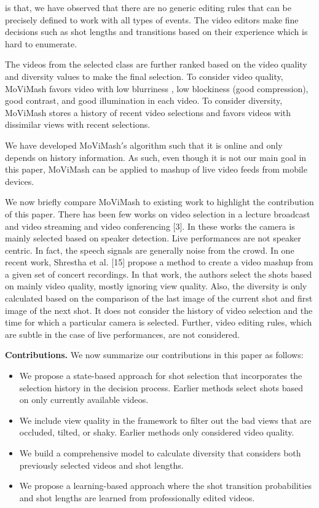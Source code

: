 \documentclass{sig-alternate-05-2015}
\begin{document}
is that, we have observed that there are no generic editing rules
that can be precisely defined to work with all types of events. The
video editors make fine decisions such as shot lengths and transitions
based on their experience which is hard to enumerate.\par
The videos from the selected class are further ranked based on
the video quality and diversity values to make the final selection.
To consider video quality, MoViMash favors video with low blurriness
, low blockiness (good compression), good contrast, and good
illumination in each video. To consider diversity, MoViMash stores
a history of recent video selections and favors videos with dissimilar
views with recent selections.\par
We have developed MoViMash$'$s algorithm such that it is online
and only depends on history information. As such, even though
it is not our main goal in this paper, MoViMash can be applied to
mashup of live video feeds from mobile devices.\par
We now briefly compare MoViMash to existing work to highlight
the contribution of this paper. There has been few works on
video selection in a lecture broadcast and video streaming \cite{economou1983green} \cite{warneke2001smart}
and video conferencing [3]. In these works the camera is mainly
selected based on speaker detection. Live performances are not
speaker centric. In fact, the speech signals are generally noise from
the crowd. In one recent work, Shrestha et al. [15] propose a
method to create a video mashup from a given set of concert recordings.
In that work, the authors select the shots based on mainly
video quality, mostly ignoring view quality. Also, the diversity is
only calculated based on the comparison of the last image of the
current shot and first image of the next shot. It does not consider
the history of video selection and the time for which a particular
camera is selected. Further, video editing rules, which are subtle in
the case of live performances, are not considered.\par
\textbf{Contributions.} We now summarize our contributions in this paper as follows:\\
\begin{itemize}
  \item We propose a state-based approach for shot selection that incorporates the selection history in the decision process. Earlier methods select shots based on only currently available videos.
  \item We include view quality in the framework to filter out the bad views that are occluded, tilted, or shaky. Earlier methods only considered video quality.
  \item We build a comprehensive model to calculate diversity that considers both previously selected videos and shot lengths.
  \item We propose a learning-based approach where the shot transition probabilities and shot lengths are learned from professionally edited videos.
\end{itemize}
\end{document}
